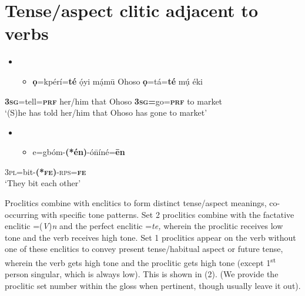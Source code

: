 \documentclass[output=paper]{langsci/langscibook}
\begin{document}
\chapter[Tense/aspect clitic adjacent to verbs]{Tense/aspect clitic adjacent to verbs}
\label{bkm:Ref406316661}\setcounter{itemize}{0}
\begin{itemize}
\item \setcounter{itemize}{0}
\begin{itemize}
\item \gll \textbf{ọ}=kpérí=\textbf{té}   ọ́yi     mạ́m\={u}   Ohoso   \textbf{ọ}=tá=\textbf{té}     mụ́  éki\\
\end{itemize}
\end{itemize}
     \textbf{  }\textbf{3}\textbf{\textsc{sg}}=tell=\textbf{\textsc{prf}}   her/him  that     Ohoso  \textbf{3}\textbf{\textsc{sg}}\textbf{=}go=\textbf{\textsc{prf}}  to  market\\
\glt   ‘(S)he has told her/him that Ohoso has gone to market’ \citep[63]{Kari2004}
\z

\begin{itemize}
\item \setcounter{itemize}{0}
\begin{itemize}
\item \gll e=gbóm-\textbf{(*én)}{}-ó\={n}íné=\textbf{\={e}n}\\
\end{itemize}
\end{itemize}
       3\textsc{pl}=bit-\textbf{(*}\textbf{\textsc{fe}}\textbf{)}{}-\textsc{rps}=\textbf{\textsc{fe}}\\
\glt   ‘They bit each other’ \citep[149]{Kari2004}
\z

Proclitics combine with enclitics to form distinct tense/aspect meanings, co-occurring with specific tone patterns. Set 2 proclitics combine with the factative enclitic =(\textit{V})\textit{n} and the perfect enclitic =\textit{te, }wherein the proclitic receives low tone and the verb receives high tone. Set 1 proclitics appear on the verb without one of these enclitics to convey present tense/habitual aspect or future tense, wherein the verb gets high tone and the proclitic gets high tone (except 1\textsuperscript{st} person singular, which is always low). This is shown in (2). (We provide the proclitic set number within the gloss when pertinent, though usually leave it out).
\end{document}
